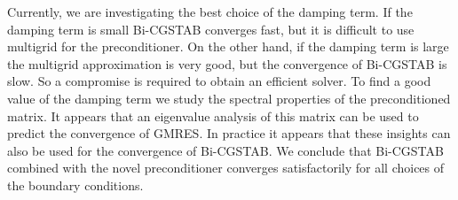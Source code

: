 \documentclass{report}
\begin{document}
Currently, we are investigating the best choice of the
damping term. If the damping term is small Bi-CGSTAB
converges fast, but it is difficult to use multigrid for the
preconditioner. On the other hand, if the damping term is
large the multigrid approximation is very good, but the
convergence of Bi-CGSTAB is slow. So a compromise is
required to obtain an efficient solver. To find a good value
of the damping term we study the spectral properties of the
preconditioned matrix. It appears that an eigenvalue 
analysis of this matrix can be used to predict the
convergence of GMRES. In practice it appears that these
insights can also be used for the convergence of Bi-CGSTAB.
We conclude that Bi-CGSTAB combined with the novel
preconditioner converges satisfactorily for all choices of
the boundary conditions.



\end{document}
